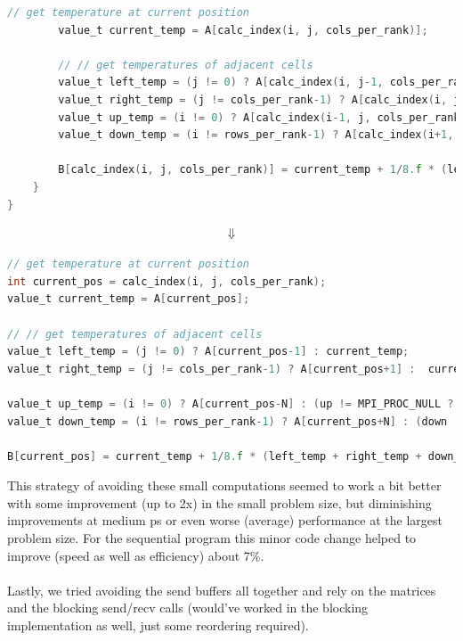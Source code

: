\documentclass[UTF-8]{article}
\begin{document}
\begin{itemize}
\begin{lstlisting}[language=c]
		// get temperature at current position
		value_t current_temp = A[calc_index(i, j, cols_per_rank)];
		
		// // get temperatures of adjacent cells
		value_t left_temp = (j != 0) ? A[calc_index(i, j-1, cols_per_rank)] : current_temp;
		value_t right_temp = (j != cols_per_rank-1) ? A[calc_index(i, j+1, cols_per_rank)] :  current_temp;
		value_t up_temp = (i != 0) ? A[calc_index(i-1, j, cols_per_rank)] : (up != MPI_PROC_NULL ? recv_up_temps[j] : current_temp);
		value_t down_temp = (i != rows_per_rank-1) ? A[calc_index(i+1, j, cols_per_rank)] : (down != MPI_PROC_NULL ? recv_down_temps[j] : current_temp);
		
		B[calc_index(i, j, cols_per_rank)] = current_temp + 1/8.f * (left_temp + right_temp + down_temp + up_temp + (-4 * current_temp));
	}
}
	\end{lstlisting}
\begin{align*}
	\Downarrow
\end{align*}
\begin{lstlisting}[language=c]
// get temperature at current position
int current_pos = calc_index(i, j, cols_per_rank);
value_t current_temp = A[current_pos];

// // get temperatures of adjacent cells
value_t left_temp = (j != 0) ? A[current_pos-1] : current_temp;
value_t right_temp = (j != cols_per_rank-1) ? A[current_pos+1] :  current_temp;

value_t up_temp = (i != 0) ? A[current_pos-N] : (up != MPI_PROC_NULL ? recv_up_temps[j] : current_temp);
value_t down_temp = (i != rows_per_rank-1) ? A[current_pos+N] : (down != MPI_PROC_NULL ? recv_down_temps[j] : current_temp);

B[current_pos] = current_temp + 1/8.f * (left_temp + right_temp + down_temp + up_temp + (-4 * current_temp));
\end{lstlisting}

This strategy of avoiding these small computations seemed to work a bit better with some improvement (up to 2x) in the small problem size, but diminishing improvements at medium ps or even worse (average) performance at the largest problem size.
For the sequential program this minor code change helped to improve (speed as well as efficiency) about 7\%.
\\\\
Lastly, we tried avoiding the send buffers all together and rely on the matrices and the blocking send/recv calls (would've worked in the blocking implementation as well, just some reordering required).


\end{itemize}
\end{document}
